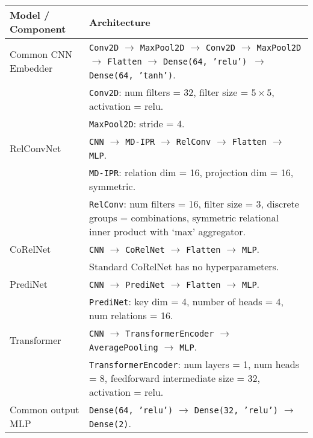 \begin{tabular}{p{}p{}}
    \toprule
    Model / Component & Architecture                                                                                                                                                                                                                                                                                       \\ \midrule
    Common CNN \newline Embedder & \texttt{Conv2D} $\to$ \texttt{MaxPool2D} $\to$ \texttt{Conv2D} $\to$ \texttt{MaxPool2D} $\to$ \texttt{Flatten} $\to$ \texttt{Dense(64, 'relu') $\to$ \texttt{Dense(64, 'tanh')}}. \\
    & \texttt{Conv2D}: num filters = 32, filter size = $5 \times 5$, activation = relu. \\
    & \texttt{MaxPool2D}: stride = 4. \\\hline
    RelConvNet        & \texttt{CNN} $\to$ \texttt{MD-IPR} $\to$ \texttt{RelConv} $\to$ \texttt{Flatten} $\to$ \texttt{MLP}. \\
    & \texttt{MD-IPR}: relation dim = 16, projection dim = 16, symmetric. \\
    & \texttt{RelConv}: num filters = 16, filter size = 3, discrete groups = combinations, symmetric relational inner product with `max' aggregator. \\\hline
    CoRelNet          & \texttt{CNN} $\to$ \texttt{CoRelNet} $\to$ \texttt{Flatten} $\to$ \texttt{MLP}. \\
    & Standard CoRelNet has no hyperparameters. \\\hline
    PrediNet          & \texttt{CNN} $\to$ \texttt{PrediNet} $\to$ \texttt{Flatten} $\to$ \texttt{MLP}. \\
    & \texttt{PrediNet}: key dim = 4, number of heads = 4, num relations = 16. \\\hline
    Transformer       & \texttt{CNN} $\to$ \texttt{TransformerEncoder} $\to$ \texttt{AveragePooling} $\to$ \texttt{MLP}. \\
    & \texttt{TransformerEncoder}: num layers = 1, num heads = 8, feedforward intermediate size = 32, activation = relu. \\\hline
    Common output MLP & \texttt{Dense(64, 'relu')} $\to$ \texttt{Dense(32, 'relu')} $\to$ \texttt{Dense(2)}. \\ \bottomrule
\end{tabular}
